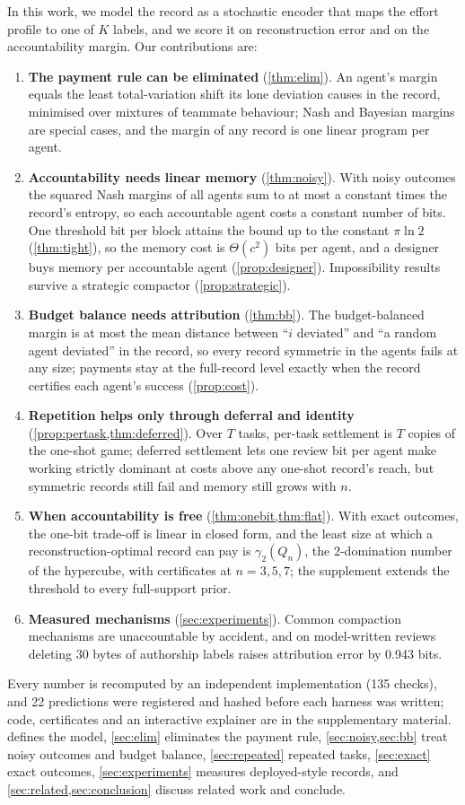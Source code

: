 \documentclass[sigconf,anonymous,acmthm=false]{aamas}
\theoremstyle{acmplain}
\theoremstyle{acmdefinition}
\begin{document}
In this work, we model the record as a stochastic encoder that maps the effort profile to
one of $K$ labels, and we score it on reconstruction error and on the accountability margin.
Our contributions are:
\begin{enumerate}
\item \textbf{The payment rule can be eliminated} (\cref{thm:elim}). An agent's margin
equals the least total-variation shift its lone deviation causes in the record, minimised
over mixtures of teammate behaviour; Nash and Bayesian margins are special cases, and the
margin of any record is one linear program per agent.
\item \textbf{Accountability needs linear memory} (\cref{thm:noisy}). With noisy outcomes the
squared Nash margins of all agents sum to at most a constant times the record's entropy, so
each accountable agent costs a constant number of bits. One threshold bit per block attains
the bound up to the constant $\pi\ln2$ (\cref{thm:tight}), so the memory cost is
$\Theta(c^2)$ bits per agent, and a designer buys memory per accountable agent
(\cref{prop:designer}). Impossibility results survive a strategic compactor
(\cref{prop:strategic}).
\item \textbf{Budget balance needs attribution} (\cref{thm:bb}). The budget-balanced margin is
at most the mean distance between ``$i$ deviated'' and ``a random agent deviated'' in the
record, so every record symmetric in the agents fails at any size; payments stay at the
full-record level exactly when the record certifies each agent's success
(\cref{prop:cost}).
\item \textbf{Repetition helps only through deferral and identity} (\cref{prop:pertask,thm:deferred}).
Over $T$ tasks, per-task settlement is $T$ copies of the one-shot game; deferred settlement
lets one review bit per agent make working strictly dominant at costs above any one-shot
record's reach, but symmetric records still fail and memory still grows with $n$.
\item \textbf{When accountability is free} (\cref{thm:onebit,thm:flat}). With exact
outcomes, the one-bit trade-off is linear in closed form, and the least size at which a
reconstruction-optimal record can pay is $\gamma_2(Q_n)$, the 2-domination number of the
hypercube, with certificates at $n=3,5,7$; the supplement extends the threshold to every
full-support prior.
\item \textbf{Measured mechanisms} (\cref{sec:experiments}). Common compaction mechanisms are
unaccountable by accident, and on model-written reviews deleting 30 bytes of authorship
labels raises attribution error by 0.943 bits.
\end{enumerate}
Every number is recomputed by an independent implementation (135 checks), and 22
predictions were registered and hashed before each harness was written; code, certificates
and an interactive explainer are in the supplementary material. 
defines the model, \cref{sec:elim} eliminates the payment rule, \cref{sec:noisy,sec:bb}
treat noisy outcomes and budget balance, \cref{sec:repeated} repeated tasks,
\cref{sec:exact} exact outcomes,
\cref{sec:experiments} measures deployed-style records, and
\cref{sec:related,sec:conclusion} discuss related work and conclude.
\end{document}
